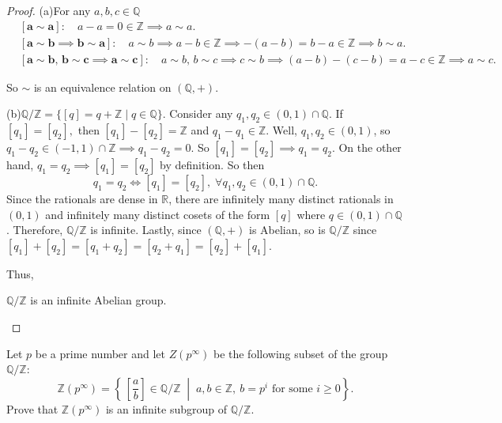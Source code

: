 \documentclass[addpoints,10pt]{exam}
\theoremstyle{plain}
\theoremstyle{definition}
\newtheorem{prob}[thm]{Problem}
\theoremstyle{plain}
\theoremstyle{plain}
\theoremstyle{definition}
\let\oldprob\prob
\let\endoldprob\endprob
\renewenvironment{prob}
  {\begin{singlespace}\oldprob}
  {\endoldprob\end{singlespace}}
\newcommand{\belowtitle}{\leavevmode\newline}
\newcommand{\QQ}{\ensuremath{\mathbb{Q}}}
\newcommand{\RR}{\ensuremath{\mathbb{R}}}
\newcommand{\ZZ}{\ensuremath{\mathbb{Z}}}
\begin{document}
\begin{proof}\belowtitle
    (a)\quad For any $a,b,c\in \QQ$
    \begin{align*}
        &\mathbf{[a\sim a]:}\quad a-a=0\in \ZZ \implies a\sim a.\\
        &\mathbf{[a\sim b\implies b\sim a]:}\quad a\sim b\implies a-b\in \ZZ \implies -(a-b)=b-a\in \ZZ\implies  b\sim a.\\
        &\mathbf{[a\sim b,\,b\sim c\implies a\sim c]:}\quad a\sim b,\,b\sim c\implies c\sim b\implies (a-b)-(c-b)=a-c\in \ZZ\implies a\sim c.
    \end{align*}

    So $\sim$ is an equivalence relation on $(\QQ,+)$.

    (b)\quad $\QQ/\ZZ=\{[q]=q+\ZZ \mid q\in \QQ\}$. Consider any $q_{1},q_{2}\in (0,1)\cap \QQ$. If $[q_{1}]=[q_{2}],$ then $[q_{1}]-[q_{2}]=\ZZ$ and $q_{1}-q_{1}\in \ZZ$. Well, $q_{1},q_{2}\in (0,1)$, so $q_{1}-q_{2}\in (-1,1)\cap \ZZ\implies q_{1}-q_{2}=0$. So $[q_{1}]=[q_{2}]\implies q_{1}=q_{2}$. On the other hand, $q_{1}=q_{2}\implies [q_{1}]=[q_{2}]$ by definition. So then
    $$q_{1}=q_{2}\iff [q_{1}]=[q_{2}],\;\forall q_{1},q_{2}\in (0,1)\cap \QQ.$$
    Since the rationals are dense in $\RR$, there are infinitely many distinct rationals in $(0,1)$ and infinitely many distinct cosets of the form $[q]$ where $q\in (0,1)\cap \QQ$. Therefore, $\QQ/\ZZ$ is infinite. Lastly, since $(\QQ,+)$ is Abelian, so is $\QQ/\ZZ$ since $[q_{1}]+[q_{2}]=[q_{1}+q_{2}]=[q_{2}+q_{1}]=[q_{2}]+[q_{1}]$.

    Thus,
    \begin{center}
    $\QQ/\ZZ$ is an infinite Abelian group.
    \end{center}
\end{proof}
\newpage

\begin{prob}
  Let $p$ be a prime number and let $Z(p^\infty)$ be the following subset of the group $\mathbb{Q}/\mathbb{Z}$:
  \[
  \ZZ(p^\infty)=\left\{\, \left[\frac{a}{b}\right] \in \mathbb{Q}/\mathbb{Z} \;\middle|\; a,b\in\mathbb{Z},\ b=p^i \text{ for some } i \ge 0 \right\}.
  \]
  Prove that $\ZZ(p^\infty)$ is an infinite subgroup of $\mathbb{Q}/\mathbb{Z}$.
\end{prob}
\end{document}
